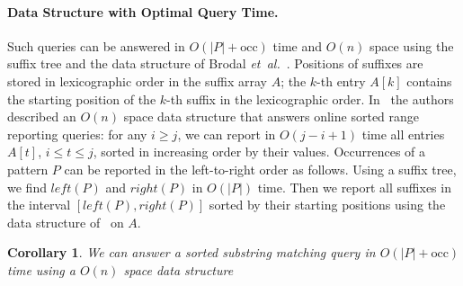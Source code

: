 \documentclass[11pt]{article}
\def\id#1{\ensuremath{\mathit{#1}}}
\let\idit=\id
\def\idrm#1{\ensuremath{\mathrm{#1}}}
\def\etal{\emph{et~al.}}
\newtheorem{corollary}{Corollary}
\newcommand{\occ}{\idrm{occ}}
\newcommand{\lleft}{\idit{left}}
\newcommand{\rright}{\idit{right}}
\begin{document}
\paragraph{Data Structure with Optimal Query Time.}
Such queries can be answered in 
$O(|P|+\occ)$ time and $O(n)$ space using the suffix tree and the data structure  of Brodal \etal~\cite{BrodalFGL09}. 
Positions of suffixes are stored in lexicographic order in the suffix array $A$;
the $k$-th entry $A[k]$ contains the starting position of the $k$-th suffix in 
the lexicographic order.  In~\cite{BrodalFGL09} the authors described an $O(n)$ space data structure that answers online sorted range reporting queries: 
for any $i\ge j$, we can report in $O(j-i+1)$ time 
all entries $A[t]$, $i\le t\le j$, sorted in increasing order by their 
values. Occurrences of a pattern $P$ can be reported in the left-to-right order as follows.  Using a suffix tree, we find $\lleft(P)$ and $\rright(P)$ in $O(|P|)$ time. Then we report all suffixes in the interval 
$[\lleft(P),\rright(P)]$ sorted by their starting positions 
using the data structure of~\cite{BrodalFGL09} on $A$. 
\begin{corollary}\label{cor:sortlin}
We can answer a sorted  substring matching query in $O(|P|+\occ)$ time using a $O(n)$ space data structure
\end{corollary}
\end{document}
